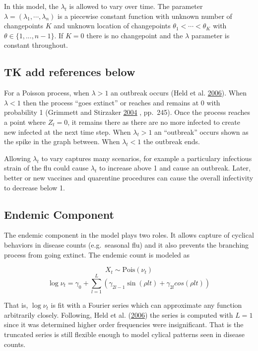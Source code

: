 \documentclass[]{article}
\numberwithin{equation}{section}
\begin{document}
In this model, the \(\lambda_t\) is allowed to vary over time. The
parameter \(\lambda = (\lambda_1,\cdots,\lambda_n)\) is a piecewise
constant function with unknown number of changepoints \(K\) and unknown
location of changepoints \(\theta_1 < \cdots < \theta_K\) with
\(\theta \in \{1,...,n-1\}\). If \(K = 0\) there is no changepoint and
the \(\lambda\) parameter is constant throughout.

\hypertarget{tk-add-references-below}{%
\subsection{TK add references below}\label{tk-add-references-below}}

For a Poisson process, when \(\lambda > 1\) an outbreak occurs (Held et
al. \protect\hyperlink{ref-held_two-component_2006}{2006}). When
\(\lambda < 1\) then the process ``goes extinct'' or reaches and remains
at 0 with probability 1 (Grimmett and Stirzaker
\protect\hyperlink{ref-grimmett_probability_2004}{2004} , pp.~245). Once
the process reaches a point where \(Z_t = 0\), it remains there as there
are no more infected to create new infected at the next time step. When
\(\lambda_t > 1\) an ``outbreak'' occurs shown as the spike in the graph
between. When \(\lambda_t < 1\) the outbreak ends.

Allowing \(\lambda_t\) to vary captures many scenarios, for example a
particulary infectious strain of the flu could cause \(\lambda_t\) to
increase above 1 and cause an outbreak. Later, better or new vaccines
and quarentine procedures can cause the overall infectivity to decrease
below 1.

\hypertarget{endemic-component}{%
\subsection{Endemic Component}\label{endemic-component}}

The endemic component in the model plays two roles. It allows capture of
cyclical behaviors in disease counts (e.g.~seasonal flu) and it also
prevents the branching process from going extinct. The endemic count is
modeled as

\[X_t \sim \text{Pois}(\nu_t)\]
\[\log{\nu_t} = \gamma_0 + \sum_{l = 1}^L (\gamma_{2l-1}\sin(\rho l t)+\gamma_{2l}cos(\rho l t))\]

That is, \(\log{\nu_t}\) is fit with a Fourier series which can
approximate any function arbitrarily closely. Following, Held et al.
(\protect\hyperlink{ref-held_two-component_2006}{2006}) the series is
computed with \(L = 1\) since it was determined higher order frequencies
were insignificant. That is the truncated series is still flexible
enough to model cylical patterns seen in disease counts.
\end{document}
